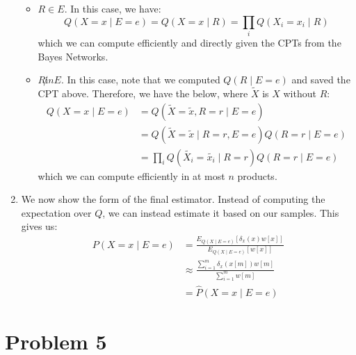 \documentclass[12pt]{article}
\begin{document}
\begin{enumerate}[label=(\alph*)]
		\begin{itemize}
			\item $R \in E$. In this case, we have:
				$$
					Q(X = x \mid E = e) = Q(X = x \mid R) = \prod_{i} Q(X_i = x_i \mid R)
				$$
				which we can compute efficiently and directly given the CPTs from the Bayes Networks.
			\item $R \not in E$. In this case, note that we computed $Q(R \mid E=e)$ and saved the CPT above. Therefore, we have the below, where $\tilde{X}$ is $X$ without $R$:
			\begin{align*}
			Q(X = x \mid E = e) &= Q(\tilde{X} = \tilde{x}, R = r \mid E = e) \\
			&= Q(\tilde{X} = \tilde{x} \mid R = r, E =e )Q(R=r \mid E=e) \\
			&= \prod_{i} Q(\tilde{X_i} = \tilde{x_i} \mid R = r)Q(R = r \mid E = e)
			\end{align*}
			which we can compute efficiently in at most $n$ products.

		\end{itemize}

	\item We now show the form of the final estimator. Instead of computing the expectation over $Q$, we can instead estimate it based on our samples. This gives us:
	\begin{align*}
		P(X = x \mid E = e) &= \frac{E_{Q(X \mid E = e)}[\delta_x(x)w[x]]}{E_{Q(X \mid E = e)}[w[x]]} \tag{Results from (i)} \\
		&\approx \frac{\sum_{i=1}^m \delta_x(x[m]) w[m]}{\sum_{i=1}^m w[m]} \\
		&= \hat{P}(X = x \mid E = e)
	\end{align*}
\end{enumerate}


\pagebreak
\section*{Problem 5}
\end{document}
